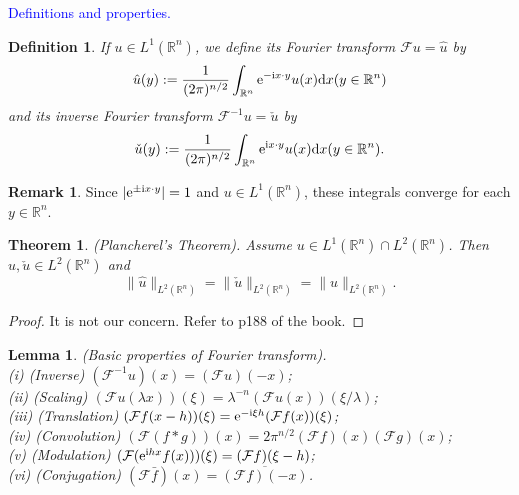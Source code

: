 \documentclass[hyperref,UTF8,12pt]{article}
\numberwithin{equation}{subsection}
\theoremstyle{plain}
\newtheorem{theorem}{Theorem}
\newtheorem{lemma}{Lemma}
\newtheorem{definition}{Definition}
\theoremstyle{definition}
\newtheorem{remark}{Remark}
\numberwithin{theorem}{section}
\numberwithin{lemma}{section}
\numberwithin{proposition}{section}
\numberwithin{remark}{section}
\numberwithin{corollary}{section}
\numberwithin{definition}{section}
\numberwithin{problem}{section}
\numberwithin{example}{section}
\def\e{\textup{e}}
\def\i{\textup{i}}
\def\dif{\textup{d}}
\newcommand{\mr}{\mathbb{R}}
\begin{document}
\noindent\textcolor{blue}{Definitions and properties.}
\begin{definition}
If $u \in L^1(\mr^n)$, we define its \emph{Fourier transform} $\mathcal{F}u=\hat{u}$ by\[
\hat{u}(y):=\frac{1}{(2\pi)^{n/2}}\int_{\mr^n}\e^{-\i x\cdot y}u(x)\dif x(y\in\mr^n)\]
and its \emph{inverse Fourier transform} $\mathcal{F}^{-1}u=\check{u}$ by\[\check{u}(y)
:=\frac{1}{(2\pi)^{n/2}}\int_{\mr^n}\e^{\i x\cdot y}u(x)\dif x(y\in\mr^n).\]
\end{definition}
\begin{remark}
Since $|\e^{ \pm\i x\cdot y}|=1$ and $u\in L^1(\mr^n)$, these integrals converge for each $y\in\mr^n$.
\end{remark}
\begin{theorem}\label{thm3.1}
(Plancherel's Theorem). Assume $u\in L^1(\mr^n)\cap L^2(\mr^n)$.
Then $\hat{u},\check{u}\in L^2(\mr^n)$ and \[\|\hat{u}\|_{L^2(\mr^n)}=
\|\check{u}\|_{L^2(\mr^n)}=\|u\|_{L^2(\mr^n)}.\tag{69}\label{69}\]
\end{theorem}
\begin{proof}
It is not our concern. Refer to p188 of the book.
\end{proof}
\begin{lemma}
(Basic properties of Fourier transform).\\
\textup{(i)} (Inverse) $(\mathcal{F}^{-1}u)(x)=(\mathcal{F}u)(-x)$;\\
\textup{(ii)} (Scaling) $(\mathcal{F}u(\lambda x))(\xi)=\lambda^{-n}(\mathcal{F}u(x)) (\xi/\lambda)$;\\
\textup{(iii)} (Translation) $(\mathcal{F}f(x-h))(\xi)=\e^{-\i\xi h}(\mathcal{F}f(x))(\xi)$; \\ 
\textup{(iv)} (Convolution) $(\mathcal{F}(f*g))(x)=2\pi^{n/2}(\mathcal{F}f)(x) (\mathcal{F}g)(x)$;\\
\textup{(v)} (Modulation) $(\mathcal{F}(\e^{\i hx}f(x)))(\xi)=(\mathcal{F}f)(\xi-h)$;\\
\textup{(vi)} (Conjugation) $(\mathcal{F}\bar{f})(x)=\overline{(\mathcal{F}f)(-x)}$.
\end{lemma}
\end{document}
